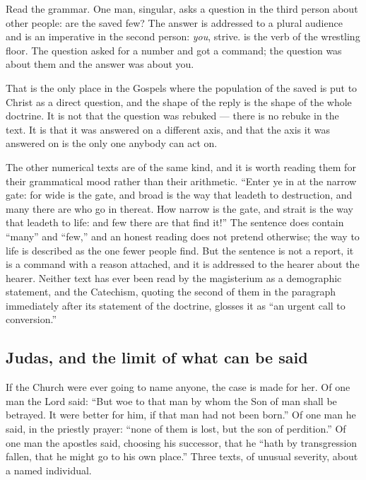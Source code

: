 Read the grammar. One man, singular, asks a question in the third person about other people: are the saved few? The answer is addressed to a plural audience and is an imperative in the second person: \emph{you}, strive.  is the verb of the wrestling floor. The question asked for a number and got a command; the question was about them and the answer was about you.

That is the only place in the Gospels where the population of the saved is put to Christ as a direct question, and the shape of the reply is the shape of the whole doctrine. It is not that the question was rebuked --- there is no rebuke in the text. It is that it was answered on a different axis, and that the axis it was answered on is the only one anybody can act on.

The other numerical texts are of the same kind, and it is worth reading them for their grammatical mood rather than their arithmetic. ``Enter ye in at the narrow gate: for wide is the gate, and broad is the way that leadeth to destruction, and many there are who go in thereat. How narrow is the gate, and strait is the way that leadeth to life: and few there are that find it!'' The sentence does contain ``many'' and ``few,'' and an honest reading does not pretend otherwise; the way to life is described as the one fewer people find. But the sentence is not a report, it is a command with a reason attached, and it is addressed to the hearer about the hearer. Neither text has ever been read by the magisterium as a demographic statement, and the Catechism, quoting the second of them in the paragraph immediately after its statement of the doctrine, glosses it as ``an urgent call to conversion.''

\subsection{Judas, and the limit of what can be said}

If the Church were ever going to name anyone, the case is made for her. Of one man the Lord said: ``But woe to that man by whom the Son of man shall be betrayed. It were better for him, if that man had not been born.'' Of one man he said, in the priestly prayer: ``none of them is lost, but the son of perdition.'' Of one man the apostles said, choosing his successor, that he ``hath by transgression fallen, that he might go to his own place.'' Three texts, of unusual severity, about a named individual.

